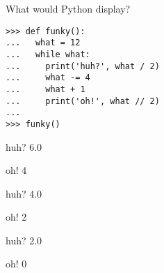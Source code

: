 \question What would Python display?
\begin{lstlisting}
>>> def funky():
...   what = 12
...   while what:
...     print('huh?', what / 2)
...     what -= 4
...     what + 1
...     print('oh!', what // 2)
...
>>> funky()
\end{lstlisting}
\begin{solution}

huh? 6.0

oh! 4

huh? 4.0

oh! 2

huh? 2.0

oh! 0
\end{solution}

